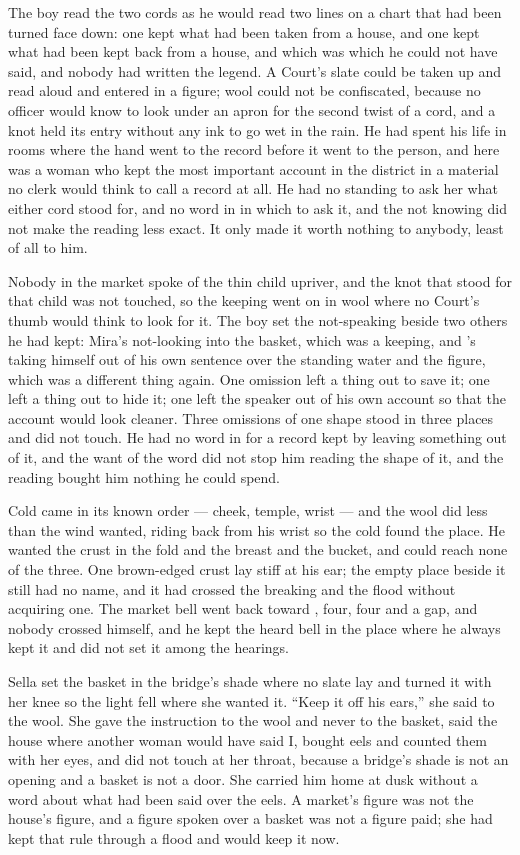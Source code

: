 The boy read the two cords as he would read two lines on a chart that had been turned face down: one kept what had been taken from a house, and one kept what had been kept back from a house, and which was which he could not have said, and nobody had written the legend. A Court's slate could be taken up and read aloud and entered in a figure; wool could not be confiscated, because no officer would know to look under an apron for the second twist of a cord, and a knot held its entry without any ink to go wet in the rain. He had spent his life in rooms where the hand went to the record before it went to the person, and here was a woman who kept the most important account in the district in a material no clerk would think to call a record at all. He had no standing to ask her what either cord stood for, and no word in  in which to ask it, and the not knowing did not make the reading less exact. It only made it worth nothing to anybody, least of all to him.

Nobody in the market spoke of the thin child upriver, and the knot that stood for that child was not touched, so the keeping went on in wool where no Court's thumb would think to look for it. The boy set the not-speaking beside two others he had kept: Mira's not-looking into the basket, which was a keeping, and 's taking himself out of his own sentence over the standing water and the figure, which was a different thing again. One omission left a thing out to save it; one left a thing out to hide it; one left the speaker out of his own account so that the account would look cleaner. Three omissions of one shape stood in three places and did not touch. He had no word in  for a record kept by leaving something out of it, and the want of the word did not stop him reading the shape of it, and the reading bought him nothing he could spend.

Cold came in its known order — cheek, temple, wrist — and the wool did less than the wind wanted, riding back from his wrist so the cold found the place. He wanted the crust in the fold and the breast and the bucket, and could reach none of the three. One brown-edged crust lay stiff at his ear; the empty place beside it still had no name, and it had crossed the breaking and the flood without acquiring one. The market bell went back toward , four, four and a gap, and nobody crossed himself, and he kept the heard bell in the place where he always kept it and did not set it among the hearings.

Sella set the basket in the bridge's shade where no slate lay and turned it with her knee so the light fell where she wanted it. “Keep it off his ears,” she said to the wool. She gave the instruction to the wool and never to the basket, said the house where another woman would have said I, bought eels and counted them with her eyes, and did not touch  at her throat, because a bridge's shade is not an opening and a basket is not a door. She carried him home at dusk without a word about what had been said over the eels. A market's figure was not the house's figure, and a figure spoken over a basket was not a figure paid; she had kept that rule through a flood and would keep it now.

